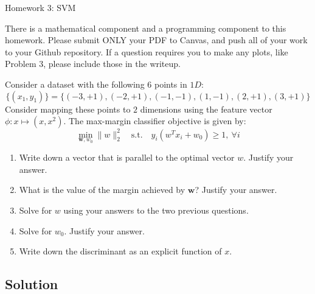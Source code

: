 \documentclass[submit]{harvardml}
\begin{document}
\begin{center}
{\Large Homework 3: SVM}\\
\end{center}

There is a mathematical component and a programming
component to this homework. Please submit ONLY your PDF to Canvas, and push all of your work to your Github repository. If a question requires you to make any plots, like Problem 3, please include those in the writeup.

\begin{problem}
Consider a dataset with the following 6 points in $1D$: \[\{(x_1, y_1)\} =\{(-3 , +1 ), (-2 , +1 ) , (-1,  -1 ), ( 1 , -1 ), ( 2 , +1 ), ( 3 , +1 )\}\] Consider mapping these points to $2$ dimensions using the
feature vector $\phi : x \mapsto (x, x^2)$. The max-margin
classifier objective is given by:
\begin{equation}
  \min_{\mathbf{w}, w_0} \|w\|_2^2 \quad \text{s.t.} \quad y_i(w^T x_i + w_0)
  \geq 1,~\forall i
\end{equation}

\begin{enumerate}
  \item Write down a vector that is parallel to the optimal vector $w$. Justify
    your answer.
  \item What is the value of the margin achieved by $\mathbf{w}$? Justify your
    answer.
  \item Solve for $w$ using your answers to the two previous questions.
  \item Solve for $w_0$. Justify your answer.
  \item Write down the discriminant as an explicit function of $x$.
\end{enumerate}

\end{problem}
\subsection*{Solution}
\end{document}
